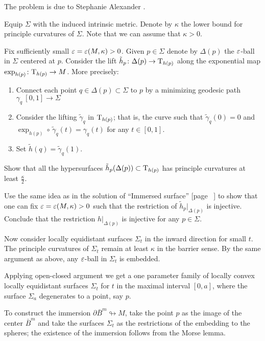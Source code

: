 The problem is due to Stephanie Alexander \cite[see][]{alexander}.



Equip $\Sigma$ with the induced intrinsic metric.
Denote by $\kappa$ the lower bound for principle curvatures of $\Sigma$.
Note that we can assume that $\kappa>0$.

Fix sufficiently small $\varepsilon=\varepsilon(M,\kappa)>0$.
Given $p\in \Sigma$ denote by $\Delta(p)$ the $\varepsilon$-ball in $\Sigma$ centered at $p$.
Consider the lift $\tilde h_p\colon\Delta(p)\to \mathrm{T}_{h(p)}$ along the exponential map $\exp_{h(p)}\colon\mathrm{T}_{h(p)}\to M$.
More precisely:
\begin{enumerate}
\item Connect each point $q\in \Delta(p)\subset \Sigma$ to $p$
by a minimizing geodesic  path $\gamma_q\:[0,1]\to \Sigma$
\item Consider the lifting $\tilde\gamma_q$ in $\mathrm{T}_{h(p)}$; 
that is, the curve such that $\tilde\gamma_q(0)=0$ 
and $\exp_{h(p)}\circ\,\tilde\gamma_q(t)=\gamma_q(t)$ for any $t\in[0,1]$.
 \item Set $\tilde h(q)=\tilde\gamma_q(1)$.
\end{enumerate}

Show that all the hypersurfaces $\tilde h_p(\Delta(p))\subset \mathrm{T}_{h(p)}$ has principle curvatures at least $\tfrac\kappa2$.

Use the same idea as in the solution of ``Immersed surface'' [page ~\pageref{Immersed surface}] to show that 
one can fix $\eps\z=\eps(M,\kappa)>0$ such that the restriction of $\tilde h_p|_{\Delta(p)}$ is injective.
Conclude that the restriction $h|_{\Delta(p)}$ is injective for any $p\in\Sigma$.

Now consider locally equidistant surfaces $\Sigma_t$ in the inward direction for small $t$. 
The principle curvatures of $\Sigma_t$ remain at least $\kappa$ in the barrier sense.
By the same argument as above, any $\varepsilon$-ball in $\Sigma_t$
is embedded.

Applying open-closed argument we get a one parameter family of locally convex locally equidistant surfaces $\Sigma_t$
for $t$ in the maximal interval $[0,a]$,
where the surface $\Sigma_a$ degenerates to a point, say $p$. 

To construct the immersion $\partial \bar B^m\looparrowright M$,
take the point $p$ as the image of the center $\bar B^m$ 
and take the surfaces $\Sigma_t$ as the restrictions of the  embedding to the spheres;
the existence of the immersion follows from the Morse lemma.\qeds

